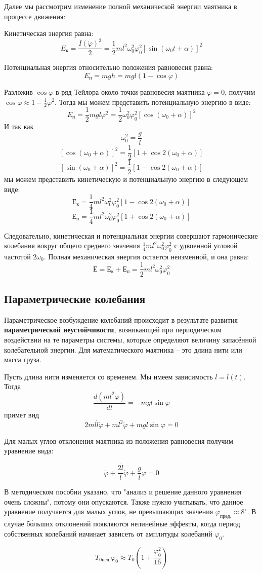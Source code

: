 \documentclass[a4paper,12pt]{article}
\begin{document}
Далее мы рассмотрим изменение полной механической энергии маятника в процессе движения:

Кинетическая энергия равна:
$$E_к = \frac{I(\dot{\varphi})^2}{2} = \frac{1}{2}ml^2\omega_0^2\varphi_0^2[\sin(\omega_0t+\alpha)]^2$$

Потенциальная энергия относительно положения равновесия равна:
$$E_п = mgh = mgl(1-\cos\varphi)$$

Разложив $\cos\varphi$ в ряд Тейлора около точки равновесия маятника $\varphi = 0$, получим $\cos\varphi \approx 1 -\frac{1}{2}\varphi^2$. Тогда мы можем представить потенциальную энергию в виде:
$$E_п = \frac{1}{2}mgl\varphi^2 = \frac{1}{2}\omega_0^2\varphi_0^2[\cos(\omega_0+\alpha)]^2$$
И так как $$\omega_0^2 = \frac{g}{l}$$
$$[\cos(\omega_0+\alpha)]^2 = \frac{1}{2}[1+\cos2(\omega_0+\alpha)]$$
$$[\sin(\omega_0+\alpha)]^2 = \frac{1}{2}[1-\cos2(\omega_0+\alpha)]$$
мы можем представить кинетическую и потенциальную энергию в следующем виде:
$$Е_к = \frac{1}{4}ml^2\omega_0^2\varphi_0^2[1-\cos2(\omega_0+\alpha)]$$
$$Е_п = \frac{1}{4}ml^2\omega_0^2\varphi_0^2[1+\cos2(\omega_0+\alpha)]$$

Следовательно, кинетическая и потенциальная энергии совершают гармонические колебания вокруг общего среднего значения $\frac{1}{4}ml^2\omega_0^2\varphi_0^2$ с удвоенной угловой частотой $2\omega_0$. Полная механическая энергия остается неизменной, и она равна:
$$Е = Е_к + Е_п = \frac{1}{2}ml^2\omega_0^2\varphi_0^2$$

\subsection{Параметрические колебания}
\hspace{\parindent}Параметрическое возбуждение колебаний происходит в результате развития \textbf{параметрической неустойчивости}, возникающей при периодическом воздействии на те параметры системы, которые определяют величину запасённой колебательной энергии. Для математического маятника – это длина нити или масса груза.

Пусть длина нити изменяется со временем. Мы имеем зависимость $l = l(t)$. Тогда
$$\frac{d(ml^2\dot{\varphi})}{dt} = -mgl\sin\varphi$$
примет вид
$$2ml\dot l\dot\varphi + ml^2\ddot{\varphi} +mgl\sin\varphi=0$$

Для малых углов отклонения маятника из положения равновесия получим уравнение вида:

$$\ddot{\varphi} + \frac{2\dot{l}}{l}\dot{\varphi} + \frac{g}{l}\varphi = 0$$

В методическом пособии указано, что "анализ и решение данного уравнения очень сложны", потому они опускаются. Также нужно учитывать, что данное уравнение получается для малых углов, не превышающих значения $\varphi_{пред.} \approx 8^{\circ}$. В случае б\'{о}льших отклонений появляются нелинейные эффекты, когда период собственных колебаний начинает зависеть от амплитуды колебаний $\varphi_0$.

\begin{equation}
T_{0 нел.}\varphi_0 \approx T_0(1+ \frac{\varphi_0^2}{16})
\end{equation}
\end{document}
